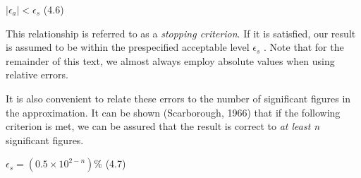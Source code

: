 \documentclass[../main.tex]{subfiles}
\begin{document}
$\left\lvert\epsilon_a\right\rvert < \epsilon_s$
\hfill
(4.6)
\newline

\noindent
This relationship is referred to as a \emph{stopping criterion}. If it is satisfied, our result is assumed
to be within the prespecified acceptable level $\epsilon_s$ . Note that for the remainder of this text, we
almost always employ absolute values when using relative errors.

It is also convenient to relate these errors to the number of significant figures in the approximation.
It can be shown (Scarborough, 1966) that if the following criterion is met, we
can be assured that the result is correct to \emph{at least n} significant figures.
\newline

$\epsilon_s = (0.5 \times 10^{2-n})\%$
\hfill
(4.7)
\newpage
\end{document}
